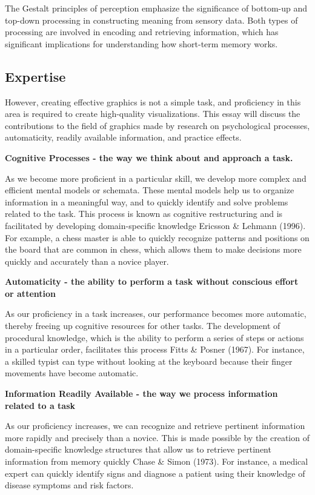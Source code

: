 \documentclass[print]{nuthesis}
\begin{document}
The Gestalt principles of perception emphasize the significance of bottom-up and top-down processing in constructing meaning from sensory data.
Both types of processing are involved in encoding and retrieving information, which has significant implications for understanding how short-term memory works.

\hypertarget{expertise}{%
\subsection{Expertise}\label{expertise}}

However, creating effective graphics is not a simple task, and proficiency in this area is required to create high-quality visualizations.
This essay will discuss the contributions to the field of graphics made by research on psychological processes, automaticity, readily available information, and practice effects.

\textbf{Cognitive Processes - the way we think about and approach a task.}

As we become more proficient in a particular skill, we develop more complex and efficient mental models or schemata.
These mental models help us to organize information in a meaningful way, and to quickly identify and solve problems related to the task.
This process is known as cognitive restructuring and is facilitated by developing domain-specific knowledge Ericsson \& Lehmann (1996).
For example, a chess master is able to quickly recognize patterns and positions on the board that are common in chess, which allows them to make decisions more quickly and accurately than a novice player.

\textbf{Automaticity - the ability to perform a task without conscious effort or attention}

As our proficiency in a task increases, our performance becomes more automatic, thereby freeing up cognitive resources for other tasks.
The development of procedural knowledge, which is the ability to perform a series of steps or actions in a particular order, facilitates this process Fitts \& Posner (1967).
For instance, a skilled typist can type without looking at the keyboard because their finger movements have become automatic.

\textbf{Information Readily Available - the way we process information related to a task}

As our proficiency increases, we can recognize and retrieve pertinent information more rapidly and precisely than a novice.
This is made possible by the creation of domain-specific knowledge structures that allow us to retrieve pertinent information from memory quickly Chase \& Simon (1973).
For instance, a medical expert can quickly identify signs and diagnose a patient using their knowledge of disease symptoms and risk factors.
\end{document}
